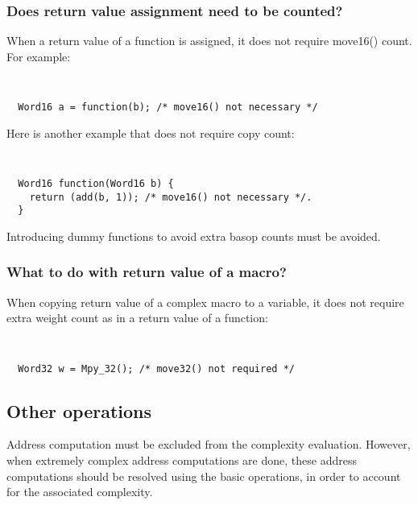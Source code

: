 \subsubsection{Does return value assignment need to be counted?}
When a return value of a function is assigned, it does not require
move16() count. For example:
{\tt\small
\begin{verbatim}
  Word16 a = function(b); /* move16() not necessary */
\end{verbatim}
}%
Here is another example that does not require copy count:
{\tt\small
\begin{verbatim}
  Word16 function(Word16 b) {
    return (add(b, 1)); /* move16() not necessary */.
  }
\end{verbatim}
}%

Introducing dummy functions to avoid extra basop
counts must be avoided. %
% 

\subsubsection{What to do with return value of a macro?}
When copying return value of a complex macro to a variable, it does
not require extra weight count as in a return value of a function:
{\tt\small
\begin{verbatim}
  Word32 w = Mpy_32(); /* move32() not required */
\end{verbatim}
} %

\subsection{Other operations}

Address computation must be excluded from the complexity
evaluation. However, when extremely complex address computations
are done, these address computations should be resolved using the
basic operations, in order to account for the associated
complexity.

